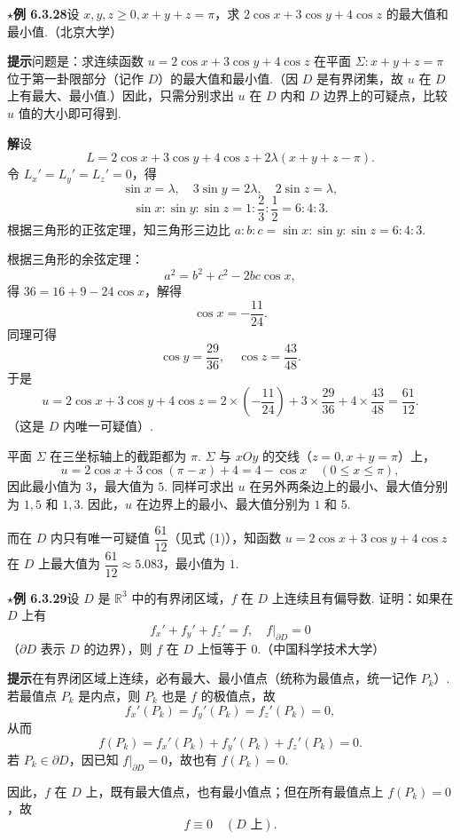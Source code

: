 \documentclass[UTF8,12pt,a4paper,fontset=fandol]{ctexart}
\begin{document}
\noindent\textbf{\ensuremath{\star}例 6.3.28}\quad 设 $x,y,z\ge0,x+y+z=\pi$，求 $2\cos x+3\cos y+4\cos z$ 的最大值和最小值.（北京大学）

\noindent\textbf{提示}\quad 问题是：求连续函数 $u=2\cos x+3\cos y+4\cos z$ 在平面 $\Sigma:x+y+z=\pi$ 位于第一卦限部分（记作 $D$）的最大值和最小值.（因 $D$ 是有界闭集，故 $u$ 在 $D$ 上有最大、最小值.）因此，只需分别求出 $u$ 在 $D$ 内和 $D$ 边界上的可疑点，比较 $u$ 值的大小即可得到.

\noindent\textbf{解}\quad 设
\[
  L=2\cos x+3\cos y+4\cos z+2\lambda(x+y+z-\pi).
\]
令 $L_x'=L_y'=L_z'=0$，得
\[
  \sin x=\lambda,\quad 3\sin y=2\lambda,\quad 2\sin z=\lambda,
\]
\[
  \sin x:\sin y:\sin z=1:\frac23:\frac12=6:4:3.
\]
根据三角形的正弦定理，知三角形三边比 $a:b:c=\sin x:\sin y:\sin z=6:4:3$.

根据三角形的余弦定理：
\[
  a^2=b^2+c^2-2bc\cos x,
\]
得 $36=16+9-24\cos x$，解得
\[
  \cos x=-\frac{11}{24}.
\]
同理可得
\[
  \cos y=\frac{29}{36},\quad \cos z=\frac{43}{48}.
\]
于是
\[
  u=2\cos x+3\cos y+4\cos z
  =2\times\left(-\frac{11}{24}\right)
  +3\times\frac{29}{36}+4\times\frac{43}{48}
  =\frac{61}{12}. \tag{1}
\]
（这是 $D$ 内唯一可疑值）.

平面 $\Sigma$ 在三坐标轴上的截距都为 $\pi$. $\Sigma$ 与 $xOy$ 的交线（$z=0,x+y=\pi$）上，
\[
  u=2\cos x+3\cos(\pi-x)+4=4-\cos x\quad(0\le x\le\pi),
\]
因此最小值为 $3$，最大值为 $5$. 同样可求出 $u$ 在另外两条边上的最小、最大值分别为 $1,5$ 和 $1,3$. 因此，$u$ 在边界上的最小、最大值分别为 $1$ 和 $5$.

而在 $D$ 内只有唯一可疑值 $\dfrac{61}{12}$（见式 (1)），知函数 $u=2\cos x+3\cos y+4\cos z$ 在 $D$ 上最大值为 $\dfrac{61}{12}\approx5.083$，最小值为 $1$.

\noindent\textbf{\ensuremath{\star}例 6.3.29}\quad 设 $D$ 是 $\mathbb{R}^3$ 中的有界闭区域，$f$ 在 $D$ 上连续且有偏导数. 证明：如果在 $D$ 上有
\[
  f_x'+f_y'+f_z'=f,\quad f\big|_{\partial D}=0
\]
（$\partial D$ 表示 $D$ 的边界），则 $f$ 在 $D$ 上恒等于 $0$.（中国科学技术大学）

\noindent\textbf{提示}\quad 在有界闭区域上连续，必有最大、最小值点（统称为最值点，统一记作 $P_k$）. 若最值点 $P_k$ 是内点，则 $P_k$ 也是 $f$ 的极值点，故
\[
  f_x'(P_k)=f_y'(P_k)=f_z'(P_k)=0,
\]
从而
\[
  f(P_k)=f_x'(P_k)+f_y'(P_k)+f_z'(P_k)=0.
\]
若 $P_k\in\partial D$，因已知 $f|_{\partial D}=0$，故也有 $f(P_k)=0$.

因此，$f$ 在 $D$ 上，既有最大值点，也有最小值点；但在所有最值点上 $f(P_k)=0$，故
\[
  f\equiv0\quad(D\text{ 上}).
\]
\end{document}
